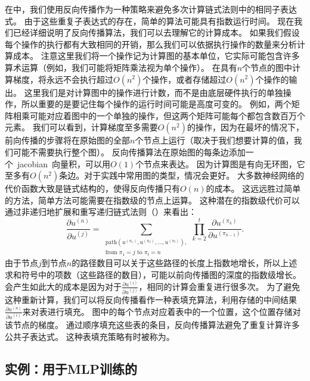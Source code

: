 在中，我们使用反向传播作为一种策略来避免多次计算链式法则中的相同子表达式。
由于这些重复子表达式的存在，简单的算法可能具有指数运行时间。
现在我们已经详细说明了反向传播算法，我们可以去理解它的计算成本。
如果我们假设每个操作的执行都有大致相同的开销，那么我们可以依据执行操作的数量来分析计算成本。
注意这里我们将一个操作记为计算图的基本单位，它实际可能包含许多算术运算（例如，我们可能将矩阵乘法视为单个操作）。
在具有$n$个节点的图中计算梯度，将永远不会执行超过$O(n^2)$个操作，或者存储超过$O(n^2)$个操作的输出。
这里我们是对计算图中的操作进行计数，而不是由底层硬件执行的单独操作，所以重要的是要记住每个操作的运行时间可能是高度可变的。
例如，两个矩阵相乘可能对应着图中的一个单独的操作，但这两个矩阵可能每个都包含数百万个元素。
我们可以看到，计算梯度至多需要$O(n^2)$的操作，因为在最坏的情况下，前向传播的步骤将在原始图的全部$n$个节点上运行（取决于我们想要计算的值，我们可能不需要执行整个图）。
反向传播算法在原始图的每条边添加一个~\gls{jacobian}~向量积，可以用$O(1)$个节点来表达。
因为计算图是有向无环图，它至多有$O(n^2)$条边。对于实践中常用图的类型，情况会更好。
大多数神经网络的代价函数大致是链式结构的，使得反向传播只有$O(n)$的成本。
这远远胜过简单的方法，简单方法可能需要在指数级的节点上运算。
这种潜在的指数级代价可以通过非递归地扩展和重写递归链式法则（）来看出：
\begin{equation}
  \frac{\partial u^{(n)}}{\partial u^{(j)}} =
  \sum_{\substack{\text{path}(u^{(\pi_1)}, u^{(\pi_2)}, \ldots, u^{(\pi_t)}  ),\\ \text{from } \pi_1=j \text{ to }\pi_t = n}}
  \prod_{k=2}^t \frac{\partial u^{(\pi_k)}}{\partial u^{(\pi_{k-1})}}.
\end{equation}
由于节点$j$到节点$n$的路径数目可以关于这些路径的长度上指数地增长，所以上述求和符号中的项数（这些路径的数目），可能以前向传播图的深度的指数级增长。
会产生如此大的成本是因为对于$\frac{\partial u^{(i)}}{\partial u^{(j)}}$，相同的计算会重复进行很多次。
为了避免这种重新计算，我们可以将反向传播看作一种表填充算法，利用存储的中间结果$\frac{\partial u^{(n)}}{\partial u^{(i)}}$来对表进行填充。
图中的每个节点对应着表中的一个位置，这个位置存储对该节点的梯度。
通过顺序填充这些表的条目，反向传播算法避免了重复计算许多公共子表达式。
这种表填充策略有时被称为。
  
  
\subsection{实例：用于MLP训练的}
\label{sec:example_back_propagation_for_mlp_training}

